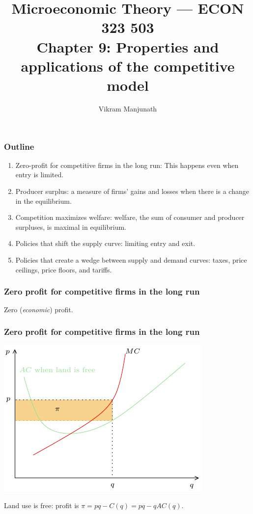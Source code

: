 \documentclass[xcolor=pdftex,dvipsnames]{beamer}
\title{Microeconomic Theory --- ECON 323 503 \\ Chapter 9: Properties
  and applications of the competitive model}
\author{Vikram Manjunath}       %
\institute{Texas A\&M University}
\begin{document}
\maketitle

\begin{frame}
\frametitle{Outline}
\begin{enumerate}[<+->]
\item Zero-profit for competitive firms in the long run: This happens
  even when entry is limited.
\item Producer surplus: a measure of firms' gains and losses when
  there is a change in the equilibrium.
\item Competition maximizes welfare: welfare, the sum of consumer and
  producer surpluses, is maximal in equilibrium.
\item Policies that shift the supply curve: limiting entry and exit.
\item Policies that create a wedge between supply and demand curves:
  taxes, price ceilings, price floors, and tariffs.
\end{enumerate}
\end{frame}




\begin{frame}
\frametitle{Zero profit for competitive firms in the long run}
Zero (\emph{economic}) profit.

\bigskip
{}
\bigskip

\bigskip

\end{frame}



\begin{frame}
\frametitle{Zero profit for competitive firms in the long run}
\begin{center}
\includegraphics{pics/ZeroProfitLand}
\end{center}
Land use is free: profit is $\pi=pq-C(q) = pq-qAC(q)$.
\end{frame}
\end{document}
